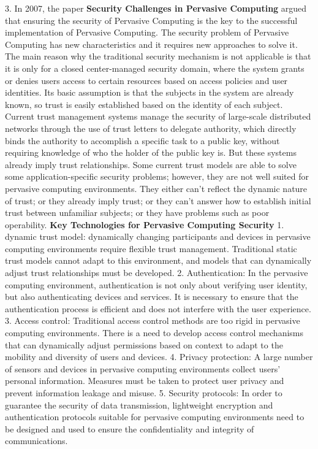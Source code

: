 \documentclass[a4paper,twoside]{scrbook}
\begin{document}
\begin{CJK}{UTF8}{gbsn}
3. In 2007, the paper \textbf{Security Challenges in Pervasive Computing}\cite{JSJA200706001} argued that ensuring the security of Pervasive Computing is the key to the successful implementation of Pervasive Computing. The security problem of Pervasive Computing has new characteristics and it requires new approaches to solve it. The main reason why the traditional security mechanism is not applicable is that it is only for a closed center-managed security domain, where the system grants or denies users access to certain resources based on access policies and user identities. Its basic assumption is that the subjects in the system are already known, so trust is easily established based on the identity of each subject. Current trust management systems manage the security of large-scale distributed networks through the use of trust letters to delegate authority, which directly binds the authority to accomplish a specific task to a public key, without requiring knowledge of who the holder of the public key is. But these systems already imply trust relationships. Some current trust models are able to solve some application-specific security problems; however, they are not well suited for pervasive computing environments. They either can't reflect the dynamic nature of trust; or they already imply trust; or they can't answer how to establish initial trust between unfamiliar subjects; or they have problems such as poor operability.
\textbf{Key Technologies for Pervasive Computing Security}
1. dynamic trust model: dynamically changing participants and devices in pervasive computing environments require flexible trust management. Traditional static trust models cannot adapt to this environment, and models that can dynamically adjust trust relationships must be developed.
2. Authentication: In the pervasive computing environment, authentication is not only about verifying user identity, but also authenticating devices and services. It is necessary to ensure that the authentication process is efficient and does not interfere with the user experience.
3. Access control: Traditional access control methods are too rigid in pervasive computing environments. There is a need to develop access control mechanisms that can dynamically adjust permissions based on context to adapt to the mobility and diversity of users and devices.
4. Privacy protection: A large number of sensors and devices in pervasive computing environments collect users' personal information. Measures must be taken to protect user privacy and prevent information leakage and misuse.
5. Security protocols: In order to guarantee the security of data transmission, lightweight encryption and authentication protocols suitable for pervasive computing environments need to be designed and used to ensure the confidentiality and integrity of communications.



\end{CJK}
\end{document}
